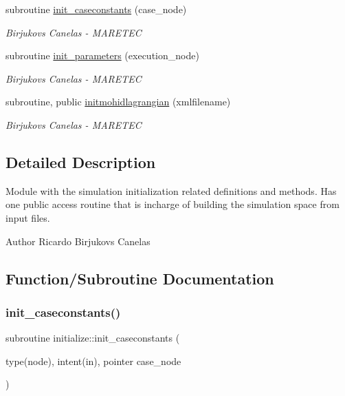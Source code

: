 \begin{DoxyCompactItemize}
subroutine \hyperlink{namespaceinitialize_a4c982b312ab10bf112dd3d2bc314569e}{init\+\_\+caseconstants} (case\+\_\+node)
\begin{DoxyCompactList}\small\item\em Birjukovs Canelas -\/ M\+A\+R\+E\+T\+EC \end{DoxyCompactList}\item 
subroutine \hyperlink{namespaceinitialize_a7a54dc126f448bea2b566339a449f85c}{init\+\_\+parameters} (execution\+\_\+node)
\begin{DoxyCompactList}\small\item\em Birjukovs Canelas -\/ M\+A\+R\+E\+T\+EC \end{DoxyCompactList}\item 
subroutine, public \hyperlink{namespaceinitialize_a45b7ca20c45cf272acbc391950cbb804}{initmohidlagrangian} (xmlfilename)
\begin{DoxyCompactList}\small\item\em Birjukovs Canelas -\/ M\+A\+R\+E\+T\+EC \end{DoxyCompactList}\end{DoxyCompactItemize}


\subsection{Detailed Description}
Module with the simulation initialization related definitions and methods. Has one public access routine that is incharge of building the simulation space from input files. 

\begin{DoxyAuthor}{Author}
Ricardo Birjukovs Canelas 
\end{DoxyAuthor}


\subsection{Function/\+Subroutine Documentation}
\mbox{\label{namespaceinitialize_a4c982b312ab10bf112dd3d2bc314569e}} 
\subsubsection{\texorpdfstring{init\+\_\+caseconstants()}{init\_caseconstants()}}
{\footnotesize\ttfamily subroutine initialize\+::init\+\_\+caseconstants (\begin{DoxyParamCaption}\item[{type(node), intent(in), pointer}]{case\+\_\+node }\end{DoxyParamCaption})\hspace{0.3cm}{\ttfamily [private]}}



